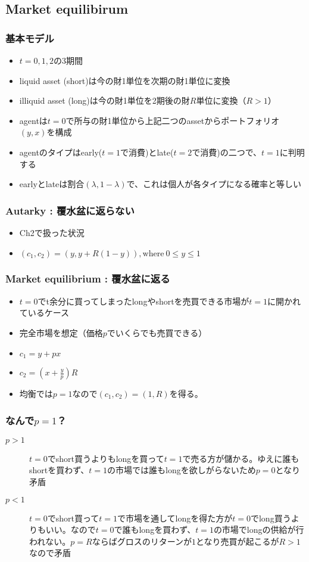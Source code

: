 \documentclass[dvipdfmx, 12pt]{beamer}
\begin{document}
\subsection{Market equilibirum}
\begin{frame}\frametitle{基本モデル}
	\begin{itemize}
		\item $t = 0,1,2$の3期間
		\item liquid asset (short)は今の財1単位を次期の財1単位に変換
		\item illiquid asset (long)は今の財1単位を2期後の財$R$単位に変換（$R > 1$）
		\item agentは$t = 0$で所与の財1単位から上記二つのassetからポートフォリオ$(y, x)$を構成
		\item agentのタイプはearly($t = 1$で消費)とlate($t = 2$で消費)の二つで、$t = 1$に判明する
		\item earlyとlateは割合$(\lambda, 1 - \lambda)$で、これは個人が各タイプになる確率と等しい
	\end{itemize}
\end{frame}
\begin{frame}\frametitle{Autarky : 覆水盆に返らない}
	\begin{itemize}
		\item Ch2で扱った状況
		\item $(c_1, c_2) = (y, y + R(1 - y)), \text{where}\ 0 \leq y \leq 1$
	\end{itemize}
\end{frame}
\begin{frame}\frametitle{Market equilibrium : 覆水盆に返る}
	\begin{itemize}
		\item $t = 0$でt余分に買ってしまったlongやshortを売買できる市場が$t = 1$に開かれているケース
		\item 完全市場を想定（価格$p$でいくらでも売買できる）
		\item $c_1 = y + px$
		\item $c_2 = (x + \frac{y}{p})R$
		\item 均衡では$p = 1$なので$(c_1, c_2) = (1, R)$を得る。
	\end{itemize}
\end{frame}
\begin{frame}\frametitle{なんで$p = 1$？}
	\begin{description}
		\item[$p > 1$] $t = 0$でshort買うよりもlongを買って$t = 1$で売る方が儲かる。ゆえに誰もshortを買わず、$t = 1$の市場では誰もlongを欲しがらないため$p = 0$となり矛盾
		\item[$p < 1$] $t = 0$でshort買って$t = 1$で市場を通してlongを得た方が$t = 0$でlong買うよりもいい。なので$t = 0$で誰もlongを買わず、$t = 1$の市場でlongの供給が行われない。$p = R$ならばグロスのリターンが$1$となり売買が起こるが$R > 1$なので矛盾
	\end{description}
\end{frame}
\end{document}
